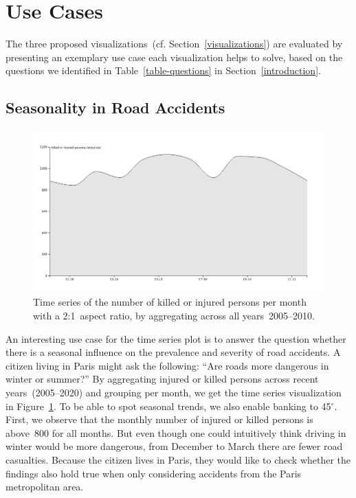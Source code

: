\section{Use Cases}
The three proposed visualizations~(cf. Section~\ref{visualizations}) are evaluated by presenting an exemplary use case each visualization helps to solve, based on the questions we identified in Table~\ref{table-questions} in Section~\ref{introduction}.

\subsection{Seasonality in Road Accidents}
\begin{figure}
    \centering
    \includegraphics[width=0.9\linewidth]{figures/time-series-2-to-1-killed-or-injured-absolute-by-year-per-month.png}
    \caption{Time series of the number of killed or injured persons per month with a 2:1~aspect ratio, by aggregating across all years~2005--2010.}
    \label{figure-time-series-killed-injured-by-year-per-month}
\end{figure}
An interesting use case for the time series plot is to answer the question whether there is a seasonal influence on the prevalence and severity of road accidents. A citizen living in Paris might ask the following: \enquote{Are roads more dangerous in winter or summer?}
By aggregating injured or killed persons across recent years~(2005--2020) and grouping per month, we get the time series visualization in Figure~\ref{figure-time-series-killed-injured-by-year-per-month}. To be able to spot seasonal trends, we also enable banking to 45\(^\circ\). First, we observe that the monthly number of injured or killed persons is above~800 for all months. But even though one could intuitively think driving in winter would be more dangerous, from December to March there are fewer road casualties.
Because the citizen lives in Paris, they would like to check whether the findings also hold true when only considering accidents from the Paris metropolitan area.
